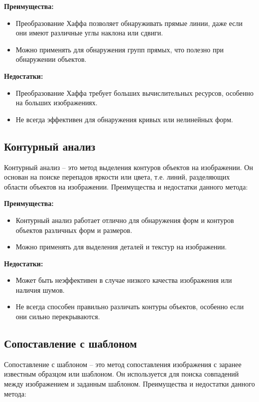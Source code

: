 \documentclass[12pt]{report}
\begin{document}
\textbf{Преимущества:}
\begin{itemize}
    \item Преобразование Хаффа позволяет обнаруживать прямые линии, даже если они имеют различные углы наклона или сдвиги.
    \item Можно применять для обнаружения групп прямых, что полезно при обнаружении объектов.
\end{itemize}

\textbf{Недостатки:}
\begin{itemize}
    \item Преобразование Хаффа требует больших вычислительных ресурсов, особенно на больших изображениях.
    \item Не всегда эффективен для обнаружения кривых или нелинейных форм.
\end{itemize}

\subsection{Контурный анализ}
Контурный анализ -- это метод выделения контуров объектов на изображении. Он основан на поиске перепадов яркости или цвета, т.е. линий, разделяющих области объектов на изображении. Преимущества и недостатки данного метода:

\textbf{Преимущества:}
\begin{itemize}
    \item Контурный анализ работает отлично для обнаружения форм и контуров объектов различных форм и размеров.
    \item Можно применять для выделения деталей и текстур на изображении.
\end{itemize}

\textbf{Недостатки:}
\begin{itemize}
    \item Может быть неэффективен в случае низкого качества изображения или наличия шумов.
    \item Не всегда способен правильно различать контуры объектов, особенно если они сильно перекрываются.
\end{itemize}

\subsection{Сопоставление с шаблоном}
Сопоставление с шаблоном -- это метод сопоставления изображения с заранее известным образцом или шаблоном. Он используется для поиска совпадений между изображением и заданным шаблоном. Преимущества и недостатки данного метода:
\end{document}
